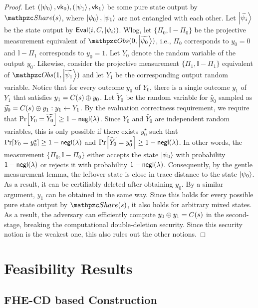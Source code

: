 \begin{proof}
Let $(\ket{\psi_0}, \mathsf{vk}_0), (\ket{\psi_1}, \mathsf{vk}_1)$ be some pure
state output by $\Sh(s)$, where $\ket{\psi_0}, \ket{\psi_1}$ are not
entangled with each other. Let $\ket{\widetilde{\psi_i}}$ be the
state output by $\mathsf{Eval}(i, C, \ket{\psi_i})$.
Wlog, let $\{\Pi_0, \mathbb{I} - \Pi_0\}$
be the projective measurement equivalent of $\Obs(0,
\ket{\widetilde{\psi_0}})$, i.e., $\Pi_0$ corresponds to $y_0 = 0$
and $\mathbb{I} - \Pi_1$ corresponds to $y_0 = 1$. Let $Y_0$ denote
the random variable of the output $y_0$. Likewise, consider the
projective measurement $\{\Pi_1, \mathbb{I} - \Pi_1\}$ equivalent of
$\Obs(1, \ket{\widetilde{\psi_1}})$ and let $Y_1$ be the
corresponding output random variable. Notice that for every outcome
$y_0$ of $Y_0$, there is a single outcome $y_1$ of $Y_1$ that
satisfies $y_1 = C(s) \oplus y_0$. Let $\widetilde{Y}_0$ be the random
variable for $\widetilde{y_0}$ sampled as $\widetilde{y_0} = C(s)
\oplus y_1 : y_1 \leftarrow Y_1$. By the evaluation correctness
requirement, we require that $\Pr[Y_0 = \widetilde{Y_0}] \ge 1 -
{\mathsf{negl}}(\lambda)$.  Since $Y_0$ and $\widetilde{Y_0}$ are independent
random variables, this is only possible if there exists $y_0^\star$
such that $\Pr[Y_0 = y_0^\star] \geq 1 - {\mathsf{negl}}(\lambda)$ and
$\Pr[\widetilde{Y_0} = y_0^\star] \geq 1 - {\mathsf{negl}}(\lambda)$. In other
words, the measurement $\{\Pi_0, \mathbb{I} - \Pi_0\}$ either
accepts the state $\ket{\psi_0}$ with probability $1 - {\mathsf{negl}}(\lambda)$
or rejects it with probability $1 - {\mathsf{negl}}(\lambda)$. Consequently, by
the gentle measurement lemma, the leftover state is close in trace
distance to the state $\ket{\psi_0}$. As a result, it can be
certifiably deleted after obtaining $y_0$. By a similar argument,
$y_1$ can be obtained in the same way. Since this holds for every
possible pure state output by $\Sh(s)$, it also holds for arbitrary
mixed states. As a result, the adversary can efficiently compute
$y_0 \oplus y_1 = C(s)$ in the second-stage, breaking the
computational double-deletion security. Since this security notion
is the weakest one, this also rules out the other notions.
\end{proof}

\section{Feasibility Results}

\subsection{FHE-CD based Construction}

